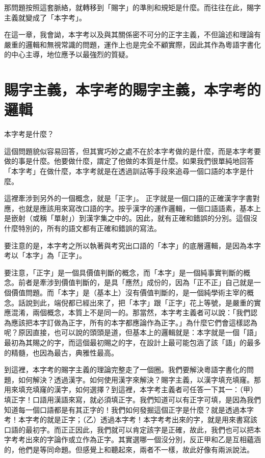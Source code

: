 \documentclass[a5paper, 12pt, openany]{book} %
\begin{document}
那問題按照這套脈絡，就轉移到「賜字」的準則和規矩是什麼。而往往在此，賜字主義就變成了「本字考」。

在這一章，我會詏，本字考以及與其關係密不可分的正字主義，不但論述和理論有嚴重的邏輯和無視常識的問題，運作上也是完全不顧實際，因此其作為粵語字書化的中心主導，地位應予以最強烈的質疑。

\section{賜字主義，本字考的賜字主義，本字考的邏輯}

本字考是什麼？

這個問題貌似容易回答，但其實巧妙之處不在於本字考做的是什麼，而是本字考要做的事是什麼。他要做什麼，謂定了他做的本質是什麼。如果我們很單純地回答「本字考」在做什麼，本字考就是在透過訓詁等手段來追尋一個口語的本字是什麼。

這裡牽涉到另外的一個概念，就是「正字」。 正字就是一個口語的正確漢字字書對應，也就是應該用來寫改口語的字。按乎漢字的運作邏輯，一個口語語素，基本上是嵌射（或稱「單射」）到漢字集之中的。因此，就有正確和錯誤的分別。這個沒什麼特別的，所有的語文都有正確和錯誤的寫法。

要注意的是，本字考之所以執著與考究出口語的「本字」的底層邏輯，是因為本字考以「本字」為「正字」。

要注意，「正字」是一個具價值判斷的概念，而「本字」是一個純事實判斷的概念。前者是牽涉到價值判斷的，是具「應然」成份的，因為「正不正」自己就是一個價值問題。而「本字」是（基本上）沒有價值判斷的，是一個純學術主宰的概念。話說到此，端倪都已經出來了，把「本字」跟「正字」花上等號，是嚴重的實應混淆，兩個概念，本質上不是同一的。那當然，本字考主義者可以說：「我們認為應該把本字訂做為正字，所有的本字都應論作為正字。」為什麼它們會這樣認為呢？原因直接，也可以說的頭頭是道，但基本上的邏輯就是：本字就是一個「語」最初為其賜之的字，而這個最初賜之的字，在設計上最可能包涵了該「語」的最多的精髓，也因為最古，典雅性最高。

到這裡，本字考的賜字主義的理論完整走了一個圈。我們要解決粵語字書化的問題，如何解決？透過漢字。如何使用漢字來解決？賜字主義，以漢字填充填窿。那用來填充填窿的漢字，如何選擇？到這裡，本字考主義者可任答一下其一：（甲）填正字！口語用漢語來寫，就必須填正字。我們知道可以有正字可填，是因為我們知道每一個口語都是有其正字的！我們如何發掘這個正字是什麼？就是透過本字考！本字考的就是正字；（乙）透過本字考！本字考考出來的字，就是用來書寫該口語的最初字。而正正因此，我們就可以肯定該字是正確，故此，我們也可以把本字考考出來的字論作或立作為正字。其實選哪一個沒分別，反正甲和乙是互相蘊涵的，他們是等同命題。但感覺上和聽起來，兩者不一樣，故此好像有兩派說法。
\end{document}
